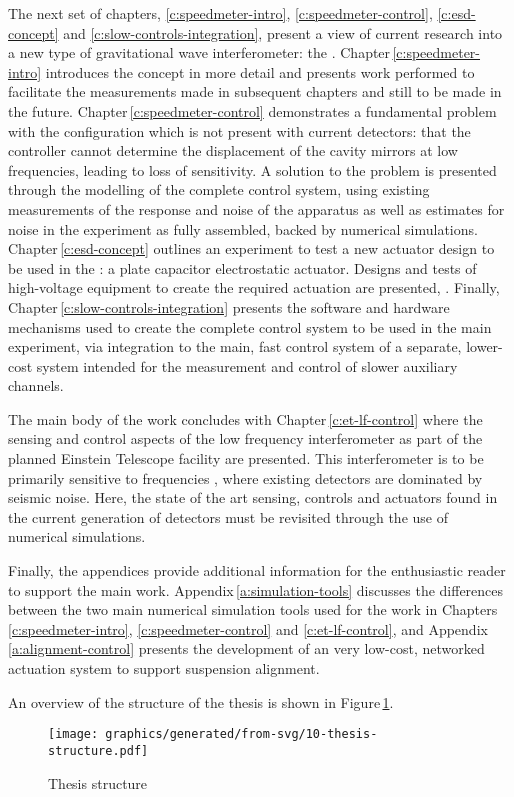 The next set of chapters, \ref{c:speedmeter-intro}, \ref{c:speedmeter-control}, \ref{c:esd-concept} and \ref{c:slow-controls-integration}, present a view of current research into a new type of gravitational wave interferometer: the \SSM{}. Chapter\,\ref{c:speedmeter-intro} introduces the concept in more detail and presents work performed to facilitate the measurements made in subsequent chapters and still to be made in the future. Chapter\,\ref{c:speedmeter-control} demonstrates a fundamental problem with the \SSM{} configuration which is not present with current detectors: that the controller cannot determine the displacement of the cavity mirrors at low frequencies, leading to loss of sensitivity. A solution to the problem is presented through the modelling of the complete control system, using existing measurements of the response and noise of the apparatus as well as estimates for noise in the experiment as fully assembled, backed by numerical simulations. Chapter\,\ref{c:esd-concept} outlines an experiment to test a new actuator design to be used in the \SSMEXPT{}: a plate capacitor electrostatic actuator. Designs and tests of high-voltage equipment to create the required actuation are presented, . Finally, Chapter\,\ref{c:slow-controls-integration} presents the software and hardware mechanisms used to create the complete control system to be used in the main experiment, via integration to the main, fast control system of a separate, lower-cost system intended for the measurement and control of slower auxiliary channels.

The main body of the work concludes with Chapter\,\ref{c:et-lf-control} where the sensing and control aspects of the low frequency interferometer as part of the planned Einstein Telescope facility are presented. This interferometer is to be primarily sensitive to frequencies , where existing detectors are dominated by seismic noise. Here, the state of the art sensing, controls and actuators found in the current generation of detectors must be revisited through the use of numerical simulations.

Finally, the appendices provide additional information for the enthusiastic reader to support the main work. Appendix\,\ref{a:simulation-tools} discusses the differences between the two main numerical simulation tools used for the work in Chapters \ref{c:speedmeter-intro}, \ref{c:speedmeter-control} and \ref{c:et-lf-control}, and Appendix\,\ref{a:alignment-control} presents the development of an very low-cost, networked actuation system to support suspension alignment.

An overview of the structure of the thesis is shown in Figure\,\ref{fig:thesis-structure}.

\begin{figure}
  \texttt{[image: graphics/generated/from-svg/10-thesis-structure.pdf]}
  \caption{Thesis structure}
  \label{fig:thesis-structure}
\end{figure}